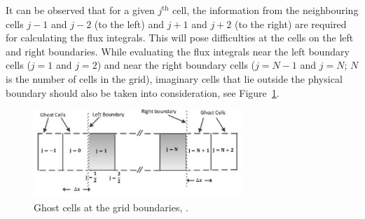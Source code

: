 \documentclass[%
]{USN-PhD}
\begin{document}
It can be observed that for a given $j^\mathrm{th}$ cell, the information from the neighbouring cells $j-1$ and $j-2$ (to the left) and $j+1$ and $j+2$ (to the right) are required for calculating the flux integrals. This will pose difficulties at the cells on the left and right boundaries. While evaluating the flux integrals near the left boundary cells ($j=1$ and $j=2$) and near the right boundary cells ($j=N-1$ and $j=N$; $N$ is the number of cells in the grid), imaginary cells that lie outside the physical boundary should also be taken into consideration, see Figure~\ref{fig:fig2_2}.
\begin{figure}[!ht]
  \centering
 \includegraphics[width=0.7\textwidth]{fig/ghosts}
 \caption{Ghost cells at the grid boundaries, \cite{Sha:15}.}
  \label{fig:fig2_2}
\end{figure}
\end{document}
